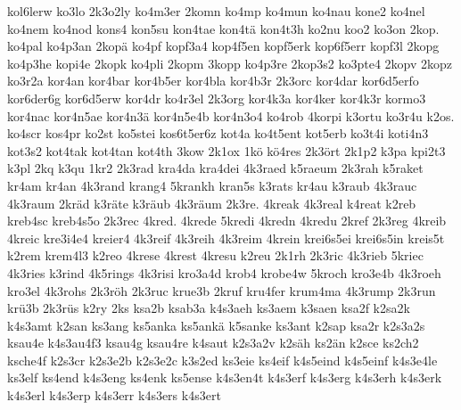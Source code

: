 {    kol6lerw
    ko3lo
    2k3o2ly
    ko4m3er
    2komn
    ko4mp
    ko4mun
    ko4nau
    kone2
    ko4nel
    ko4nem
    ko4nod
    kons4
    kon5su
    kon4tae
    kon4tä
    kon4t3h
    ko2nu
    koo2
    ko3on
    2kop.
    ko4pal
    ko4p3an
    2kopä
    ko4pf
    kopf3a4
    kop4f5en
    kopf5erk
    kop6f5err
    kopf3l
    2kopg
    ko4p3he
    kopi4e
    2kopk
    ko4pli
    2kopm
    3kopp
    ko4p3re
    2kop3s2
    ko3pte4
    2kopv
    2kopz
    ko3r2a
    kor4an
    kor4bar
    kor4b5er
    kor4bla
    kor4b3r
    2k3orc
    kor4dar
    kor6d5erfo
    kor6der6g
    kor6d5erw
    kor4dr
    ko4r3el
    2k3org
    kor4k3a
    kor4ker
    kor4k3r
    kormo3
    kor4nac
    kor4n5ae
    kor4n3ä
    kor4n5e4b
    kor4n3o4
    ko4rob
    4korpi
    k3ortu
    ko3r4u
    k2os.
    ko4scr
    kos4pr
    ko2st
    ko5stei
    kos6t5er6z
    kot4a
    ko4t5ent
    kot5erb
    ko3t4i
    koti4n3
    kot3s2
    kot4tak
    kot4tan
    kot4th
    3kow
    2k1ox
    1kö
    kö4res
    2k3ört
    2k1p2
    k3pa
    kpi2t3
    k3pl
    2kq
    k3qu
    1kr2
    2k3rad
    kra4da
    kra4dei
    4k3raed
    k5raeum
    2k3rah
    k5raket
    kr4am
    kr4an
    4k3rand
    krang4
    5krankh
    kran5s
    k3rats
    kr4au
    k3raub
    4k3rauc
    4k3raum
    2kräd
    k3räte
    k3räub
    4k3räum
    2k3re.
    4kreak
    4k3real
    k4reat
    k2reb
    kreb4sc
    kreb4s5o
    2k3rec
    4kred.
    4krede
    5kredi
    4kredn
    4kredu
    2kref
    2k3reg
    4kreib
    4kreic
    kre3i4e4
    kreier4
    4k3reif
    4k3reih
    4k3reim
    4krein
    krei6s5ei
    krei6s5in
    kreis5t
    k2rem
    krem4l3
    k2reo
    4krese
    4krest
    4kresu
    k2reu
    2k1rh
    2k3ric
    4k3rieb
    5kriec
    4k3ries
    k3rind
    4k5rings
    4k3risi
    kro3a4d
    krob4
    krobe4w
    5kroch
    kro3e4b
    4k3roeh
    kro3el
    4k3rohs
    2k3röh
    2k3ruc
    krue3b
    2kruf
    kru4fer
    krum4ma
    4k3rump
    2k3run
    krü3b
    2k3rüs
    k2ry
    2ks
    ksa2b
    ksab3a
    k4s3aeh
    ks3aem
    k3saen
    ksa2f
    k2sa2k
    k4s3amt
    k2san
    ks3ang
    ks5anka
    ks5ankä
    k5sanke
    ks3ant
    k2sap
    ksa2r
    k2s3a2s
    ksau4e
    k4s3au4f3
    ksau4g
    ksau4re
    k4saut
    k2s3a2v
    k2säh
    ks2än
    k2sce
    ks2ch2
    ksche4f
    k2s3cr
    k2s3e2b
    k2s3e2c
    k3s2ed
    ks3eie
    ks4eif
    k4s5eind
    k4s5einf
    k4s3e4le
    ks3elf
    ks4end
    k4s3eng
    ks4enk
    ks5ense
    k4s3en4t
    k4s3erf
    k4s3erg
    k4s3erh
    k4s3erk
    k4s3erl
    k4s3erp
    k4s3err
    k4s3ers
    k4s3ert
}
